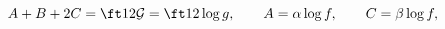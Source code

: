 \begin{equation}
A+B+2C=\ft12{\cal G}=\ft12\log g,\qquad A=\alpha\log f,\qquad C=\beta\log f,
\end{equation}

